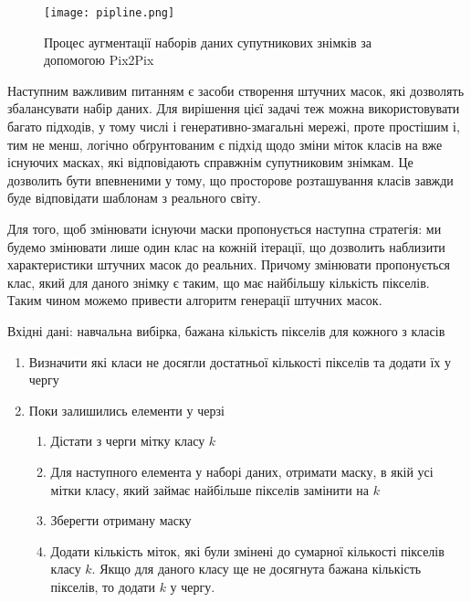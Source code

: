 \begin{figure}[!ht]
    \centering
    \texttt{[image: pipline.png]}
    \caption{Процес аугментації наборів даних супутникових знімків за допомогою Pix2Pix}
    \label{fig:pipline}
\end{figure}

Наступним важливим питанням є засоби створення штучних масок,
які дозволять збалансувати набір даних. Для вирішення цієї
задачі теж можна використовувати багато підходів, у тому числі і
генеративно-змагальні мережі, проте простішим і, тим не менш,
логічно обґрунтованим є підхід щодо зміни міток класів на вже
існуючих масках, які відповідають справжнім супутниковим знімкам.
Це дозволить бути впевненими у тому, що просторове розташування
класів завжди буде відповідати шаблонам з реального світу.

Для того, щоб змінювати існуючи маски пропонується наступна
стратегія: ми будемо змінювати лише один клас на кожній ітерації, що
дозволить наблизити характеристики штучних масок до реальних.
Причому змінювати пропонується клас, який для даного знімку є таким,
що має найбільшу кількість пікселів. Таким чином можемо
привести алгоритм генерації штучних масок.

\begin{algorithm} \leavevmode \linebreak
    Вхідні дані: навчальна вибірка, бажана кількість пікселів для кожного з класів
    \begin{enumerate}
        \item Визначити які класи не досягли достатньої кількості пікселів та додати їх у чергу
        \item Поки залишились елементи у черзі

              \begin{enumerate}
                  \item Дістати з черги мітку класу $k$
                  \item Для наступного елемента у наборі даних, отримати маску,
                        в якій усі мітки класу, який займає найбільше пікселів замінити
                        на $k$
                  \item Зберегти отриману маску
                  \item Додати кількість міток, які були змінені до
                        сумарної кількості пікселів класу $k$. Якщо для даного
                        класу ще не досягнута бажана кількість пікселів, то додати $k$ у чергу.
              \end{enumerate}
    \end{enumerate}
\end{algorithm}


